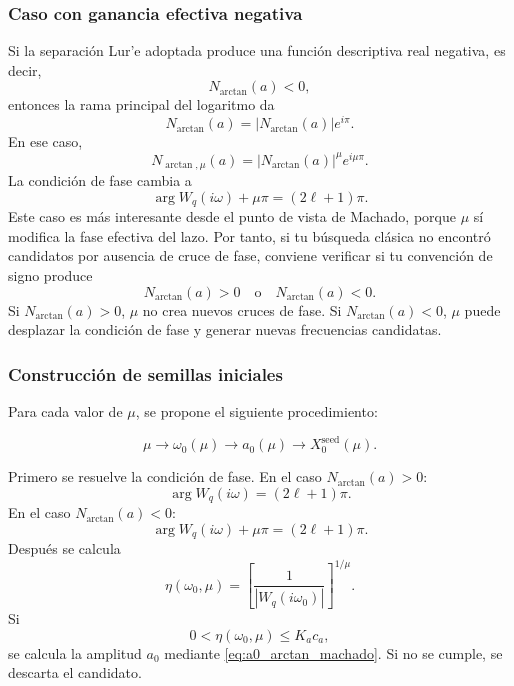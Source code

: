 \documentclass[journal]{IEEEtran}
\begin{document}
\subsubsection{Caso con ganancia efectiva negativa}

Si la separación Lur'e adoptada produce una función descriptiva real negativa,
es decir,
\[
N_{\arctan}(a)<0,
\]
entonces la rama principal del logaritmo da
\[
N_{\arctan}(a)
=
|N_{\arctan}(a)|e^{i\pi}.
\]
En ese caso,
\[
N_{\arctan,\mu}(a)
=
|N_{\arctan}(a)|^\mu e^{i\mu\pi}.
\]
La condición de fase cambia a
\begin{equation}
\label{eq:phase_arctan_negative}
\arg
W_q(i\omega)
+
\mu\pi
=
(2\ell+1)\pi.
\end{equation}
Este caso es más interesante desde el punto de vista de Machado, porque
\(\mu\) sí modifica la fase efectiva del lazo. Por tanto, si tu búsqueda
clásica no encontró candidatos por ausencia de cruce de fase, conviene
verificar si tu convención de signo produce
\[
N_{\arctan}(a)>0
\quad
\text{o}
\quad
N_{\arctan}(a)<0.
\]
Si \(N_{\arctan}(a)>0\), \(\mu\) no crea nuevos cruces de fase. Si
\(N_{\arctan}(a)<0\), \(\mu\) puede desplazar la condición de fase y generar
nuevas frecuencias candidatas.

\subsubsection{Construcción de semillas iniciales}

Para cada valor de \(\mu\), se propone el siguiente procedimiento:

\[
\mu
\longrightarrow
\omega_0(\mu)
\longrightarrow
a_0(\mu)
\longrightarrow
X_0^{\mathrm{seed}}(\mu).
\]

Primero se resuelve la condición de fase. En el caso \(N_{\arctan}(a)>0\):
\[
\arg
W_q(i\omega)
=
(2\ell+1)\pi.
\]
En el caso \(N_{\arctan}(a)<0\):
\[
\arg
W_q(i\omega)
+
\mu\pi
=
(2\ell+1)\pi.
\]
Después se calcula
\[
\eta(\omega_0,\mu)
=
\left[
\frac{1}{
\left|
W_q(i\omega_0)
\right|}
\right]^{1/\mu}.
\]
Si
\[
0<\eta(\omega_0,\mu)\le K_a c_a,
\]
se calcula la amplitud \(a_0\) mediante
\eqref{eq:a0_arctan_machado}. Si no se cumple, se descarta el candidato.
\end{document}
